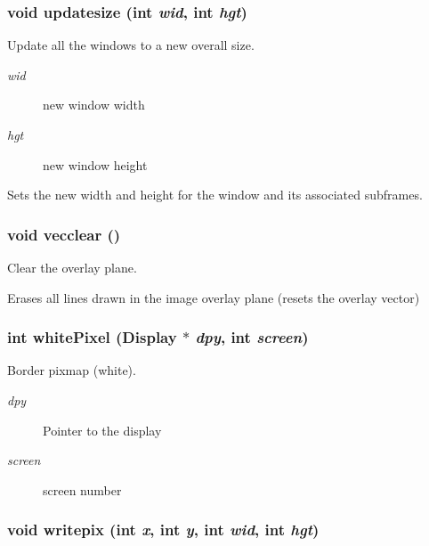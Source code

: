 \subsubsection{\setlength{\rightskip}{0pt plus 5cm}void updatesize (int {\em wid}, int {\em hgt})}\label{xtv_8h_a86}


Update all the windows to a new overall size. 

\begin{Desc}
\item[Parameters:]
\begin{description}
\item[{\em wid}]new window width \item[{\em hgt}]new window height\end{description}
\end{Desc}
Sets the new width and height for the window and its associated subframes. 
\subsubsection{\setlength{\rightskip}{0pt plus 5cm}void vecclear ()}\label{xtv_8h_a75}


Clear the overlay plane. 

Erases all lines drawn in the image overlay plane (resets the overlay vector) 
\subsubsection{\setlength{\rightskip}{0pt plus 5cm}int white\-Pixel (Display $\ast$ {\em dpy}, int {\em screen})}\label{xtv_8h_a116}


Border pixmap (white). 

\begin{Desc}
\item[Parameters:]
\begin{description}
\item[{\em dpy}]Pointer to the display \item[{\em screen}]screen number \end{description}
\end{Desc}
\subsubsection{\setlength{\rightskip}{0pt plus 5cm}void writepix (int {\em x}, int {\em y}, int {\em wid}, int {\em hgt})}\label{xtv_8h_a101}


